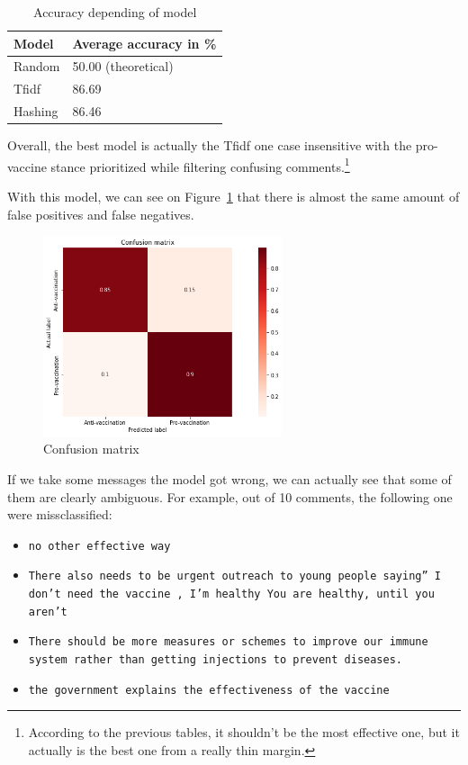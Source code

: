 \documentclass[11pt]{article}
\begin{document}
\begin{table}[htb]
\begin{center}
\begin{tabular}{l|l}
\hline \bf Model & \bf Average accuracy in \% \\ \hline
Random & 50.00 (theoretical) \\
Tfidf & 86.69 \\
Hashing & 86.46 %
\end{tabular}
\end{center}
\caption{Accuracy depending of model}
\label{table:model_accuracies}
\end{table}

Overall, the best model is actually the Tfidf one case insensitive
with the pro-vaccine stance prioritized while filtering confusing comments.\footnote
{According to the previous tables, it shouldn't be the most effective one,
but it actually is the best one from a really thin margin.}

With this model, we can see on Figure~\ref{fig:confusion} that there is almost the same amount of
false positives and false negatives.

\begin{figure}[htb]
\begin{center}
\includegraphics[width=70mm]{data/confusion.png}
\end{center}
\caption{Confusion matrix}
\label{fig:confusion}
\end{figure}

If we take some messages the model got wrong, we can actually see that some of them are clearly ambiguous.
For example, out of 10 comments, the following one were missclassified:

\begin{itemize}
\item\texttt{no other effective way}
\item\texttt{There also needs to be urgent outreach to young people saying” I don’t need the vaccine , I’m healthy You are healthy, until you aren’t}
\item\texttt{There should be more measures or schemes to improve our immune system rather than getting injections to prevent diseases.}
\item\texttt{the government explains the effectiveness of the vaccine}
\end{itemize}
\end{document}
